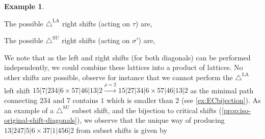 \documentclass{amsart}
\theoremstyle{definition}
\newtheorem{example}[theorem]{Example}
\newcommand{\SUD}{\triangle^{\mathrm{SU}}}
\newcommand{\LAD}{\triangle^{\mathrm{LA}}}
\begin{document}
\begin{example}
\begin{center}
{
}
\end{center}
The possible $\LAD$ right shifts (acting on $\tau$)  are,
\begin{center}
\end{center}
The possible $\SUD$ right shifts (acting on $\sigma'$) are,
\begin{center}
\end{center}
We note that as the left and right shifts (for both diagonals) can be performed independently, we could combine these lattices into a product of lattices. 
No other shifts are possible, observe for instance that we cannot perform the $\LAD$ left shift $15|7|234|6 \times 57|46|13|2 \xrightarrow{\rho=2} 15|27|34|6 \times 57|46|13|2$ as the minimal path connecting $234$ and $7$ contains $1$ which is smaller than $2$ (see \cref{ex:ECbijection}).
As an example of a $\SUD$ subset shift, and the bijection to critical shifts (\cref{prop:iso-original-shift-diagonals}), we observe that the unique way of producing $13|247|5|6 \times 37|1|456|2$ from subset shifts is given by
\begin{center}
\end{center}
\end{example}
\end{document}
